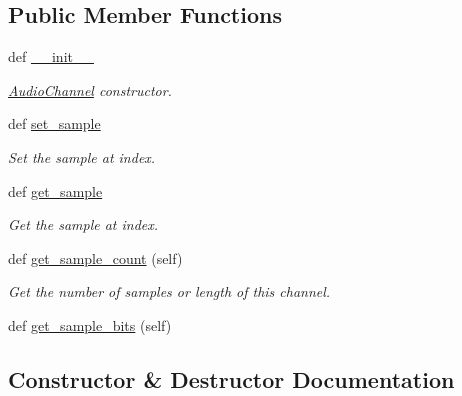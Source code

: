 \subsection*{Public Member Functions}
\begin{DoxyCompactItemize}
\item 
def \hyperlink{classbridges_1_1audio__channel_1_1_audio_channel_a70152da44f434f0ea87f1756a0a884fb}{\+\_\+\+\_\+init\+\_\+\+\_\+}
\begin{DoxyCompactList}\small\item\em \hyperlink{classbridges_1_1audio__channel_1_1_audio_channel}{Audio\+Channel} constructor. \end{DoxyCompactList}\item 
def \hyperlink{classbridges_1_1audio__channel_1_1_audio_channel_adc84cb1c65d84184353603d9fd051017}{set\+\_\+sample}
\begin{DoxyCompactList}\small\item\em Set the sample at index. \end{DoxyCompactList}\item 
def \hyperlink{classbridges_1_1audio__channel_1_1_audio_channel_a1f695d07aa5c95866036b0a55f88d9ae}{get\+\_\+sample}
\begin{DoxyCompactList}\small\item\em Get the sample at index. \end{DoxyCompactList}\item 
def \hyperlink{classbridges_1_1audio__channel_1_1_audio_channel_a5d4780923b9c11029a1d6847db5480d2}{get\+\_\+sample\+\_\+count} (self)
\begin{DoxyCompactList}\small\item\em Get the number of samples or length of this channel. \end{DoxyCompactList}\item 
def \hyperlink{classbridges_1_1audio__channel_1_1_audio_channel_ae9b2e6e0f5aaebc5adc21815f4fe2f9a}{get\+\_\+sample\+\_\+bits} (self)
\end{DoxyCompactItemize}


\subsection{Constructor \& Destructor Documentation}
\mbox{\label{classbridges_1_1audio__channel_1_1_audio_channel_a70152da44f434f0ea87f1756a0a884fb}} 
